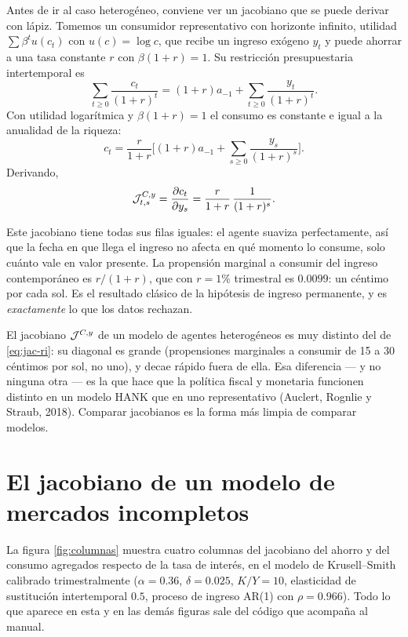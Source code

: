 Antes de ir al caso heterogéneo, conviene ver un jacobiano que se puede derivar
con lápiz. Tomemos un consumidor representativo con horizonte infinito,
utilidad $\sum \beta^t u(c_t)$ con $u(c)=\log c$, que recibe un ingreso
exógeno $y_t$ y puede ahorrar a una tasa constante $r$ con $\beta(1+r)=1$. Su
restricción presupuestaria intertemporal es
\begin{equation}
\sum_{t\ge 0} \frac{c_t}{(1+r)^t} = (1+r)a_{-1} + \sum_{t\ge 0}\frac{y_t}{(1+r)^t}.
\end{equation}
Con utilidad logarítmica y $\beta(1+r)=1$ el consumo es constante e igual a la
anualidad de la riqueza:
\begin{equation}
c_t = \frac{r}{1+r}\Big[(1+r)a_{-1} + \sum_{s\ge0}\frac{y_s}{(1+r)^s}\Big].
\end{equation}
Derivando,
\begin{equation}
\mathcal{J}^{C,y}_{t,s} = \frac{\partial c_t}{\partial y_s} = \frac{r}{1+r}\,\frac{1}{(1+r)^s}.
\label{eq:jac-ri}
\end{equation}

Este jacobiano tiene todas sus filas iguales: el agente suaviza perfectamente,
así que la fecha en que llega el ingreso no afecta en qué momento lo consume,
solo cuánto vale en valor presente. La propensión marginal a consumir del
ingreso contemporáneo es $r/(1+r)$, que con $r=1\%$ trimestral es $0.0099$: un
céntimo por cada sol. Es el resultado clásico de la hipótesis de ingreso
permanente, y es \emph{exactamente} lo que los datos rechazan.

\begin{idea}
El jacobiano $\mathcal{J}^{C,y}$ de un modelo de agentes heterogéneos es muy distinto del
de \eqref{eq:jac-ri}: su diagonal es grande (propensiones marginales a consumir
de 15 a 30 céntimos por sol, no uno), y decae rápido fuera de ella. Esa
diferencia --- y no ninguna otra --- es la que hace que la política fiscal y
monetaria funcionen distinto en un modelo HANK que en uno representativo
(Auclert, Rognlie y Straub, 2018). Comparar jacobianos es la forma más limpia de
comparar modelos.
\end{idea}

\section{El jacobiano de un modelo de mercados incompletos}

La figura \ref{fig:columnas} muestra cuatro columnas del jacobiano del ahorro y
del consumo agregados respecto de la tasa de interés, en el modelo de
Krusell--Smith calibrado trimestralmente ($\alpha=0.36$, $\delta=0.025$,
$K/Y=10$, elasticidad de sustitución intertemporal $0.5$, proceso de ingreso
AR(1) con $\rho=0.966$). Todo lo que aparece en esta y en las demás figuras sale
del código que acompaña al manual.

